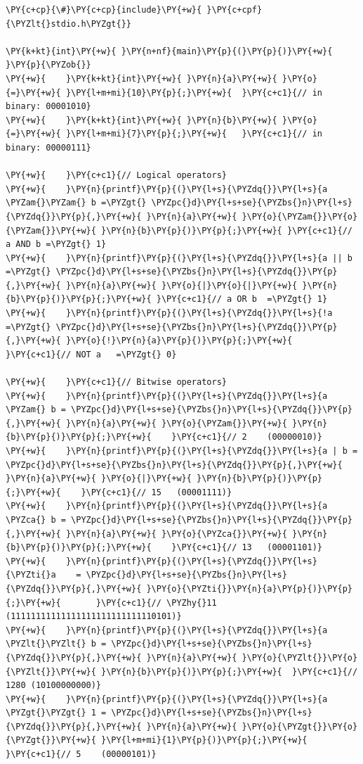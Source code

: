 \begin{Verbatim}[label=\makebox{\url{https://github.com/lucabaldini/cmepda/tree/master/slides/latex/snippets/bitwise_and_logical.c}},commandchars=\\\{\}]
\PY{c+cp}{\#}\PY{c+cp}{include}\PY{+w}{ }\PY{c+cpf}{\PYZlt{}stdio.h\PYZgt{}}

\PY{k+kt}{int}\PY{+w}{ }\PY{n+nf}{main}\PY{p}{(}\PY{p}{)}\PY{+w}{ }\PY{p}{\PYZob{}}
\PY{+w}{    }\PY{k+kt}{int}\PY{+w}{ }\PY{n}{a}\PY{+w}{ }\PY{o}{=}\PY{+w}{ }\PY{l+m+mi}{10}\PY{p}{;}\PY{+w}{  }\PY{c+c1}{// in binary: 00001010}
\PY{+w}{    }\PY{k+kt}{int}\PY{+w}{ }\PY{n}{b}\PY{+w}{ }\PY{o}{=}\PY{+w}{ }\PY{l+m+mi}{7}\PY{p}{;}\PY{+w}{   }\PY{c+c1}{// in binary: 00000111}

\PY{+w}{    }\PY{c+c1}{// Logical operators}
\PY{+w}{    }\PY{n}{printf}\PY{p}{(}\PY{l+s}{\PYZdq{}}\PY{l+s}{a \PYZam{}\PYZam{} b =\PYZgt{} \PYZpc{}d}\PY{l+s+se}{\PYZbs{}n}\PY{l+s}{\PYZdq{}}\PY{p}{,}\PY{+w}{ }\PY{n}{a}\PY{+w}{ }\PY{o}{\PYZam{}}\PY{o}{\PYZam{}}\PY{+w}{ }\PY{n}{b}\PY{p}{)}\PY{p}{;}\PY{+w}{ }\PY{c+c1}{// a AND b =\PYZgt{} 1}
\PY{+w}{    }\PY{n}{printf}\PY{p}{(}\PY{l+s}{\PYZdq{}}\PY{l+s}{a || b =\PYZgt{} \PYZpc{}d}\PY{l+s+se}{\PYZbs{}n}\PY{l+s}{\PYZdq{}}\PY{p}{,}\PY{+w}{ }\PY{n}{a}\PY{+w}{ }\PY{o}{|}\PY{o}{|}\PY{+w}{ }\PY{n}{b}\PY{p}{)}\PY{p}{;}\PY{+w}{ }\PY{c+c1}{// a OR b  =\PYZgt{} 1}
\PY{+w}{    }\PY{n}{printf}\PY{p}{(}\PY{l+s}{\PYZdq{}}\PY{l+s}{!a     =\PYZgt{} \PYZpc{}d}\PY{l+s+se}{\PYZbs{}n}\PY{l+s}{\PYZdq{}}\PY{p}{,}\PY{+w}{ }\PY{o}{!}\PY{n}{a}\PY{p}{)}\PY{p}{;}\PY{+w}{     }\PY{c+c1}{// NOT a   =\PYZgt{} 0}

\PY{+w}{    }\PY{c+c1}{// Bitwise operators}
\PY{+w}{    }\PY{n}{printf}\PY{p}{(}\PY{l+s}{\PYZdq{}}\PY{l+s}{a \PYZam{} b = \PYZpc{}d}\PY{l+s+se}{\PYZbs{}n}\PY{l+s}{\PYZdq{}}\PY{p}{,}\PY{+w}{ }\PY{n}{a}\PY{+w}{ }\PY{o}{\PYZam{}}\PY{+w}{ }\PY{n}{b}\PY{p}{)}\PY{p}{;}\PY{+w}{    }\PY{c+c1}{// 2    (00000010)}
\PY{+w}{    }\PY{n}{printf}\PY{p}{(}\PY{l+s}{\PYZdq{}}\PY{l+s}{a | b = \PYZpc{}d}\PY{l+s+se}{\PYZbs{}n}\PY{l+s}{\PYZdq{}}\PY{p}{,}\PY{+w}{ }\PY{n}{a}\PY{+w}{ }\PY{o}{|}\PY{+w}{ }\PY{n}{b}\PY{p}{)}\PY{p}{;}\PY{+w}{    }\PY{c+c1}{// 15   (00001111)}
\PY{+w}{    }\PY{n}{printf}\PY{p}{(}\PY{l+s}{\PYZdq{}}\PY{l+s}{a \PYZca{} b = \PYZpc{}d}\PY{l+s+se}{\PYZbs{}n}\PY{l+s}{\PYZdq{}}\PY{p}{,}\PY{+w}{ }\PY{n}{a}\PY{+w}{ }\PY{o}{\PYZca{}}\PY{+w}{ }\PY{n}{b}\PY{p}{)}\PY{p}{;}\PY{+w}{    }\PY{c+c1}{// 13   (00001101)}
\PY{+w}{    }\PY{n}{printf}\PY{p}{(}\PY{l+s}{\PYZdq{}}\PY{l+s}{\PYZti{}a    = \PYZpc{}d}\PY{l+s+se}{\PYZbs{}n}\PY{l+s}{\PYZdq{}}\PY{p}{,}\PY{+w}{ }\PY{o}{\PYZti{}}\PY{n}{a}\PY{p}{)}\PY{p}{;}\PY{+w}{       }\PY{c+c1}{// \PYZhy{}11  (11111111111111111111111111110101)}
\PY{+w}{    }\PY{n}{printf}\PY{p}{(}\PY{l+s}{\PYZdq{}}\PY{l+s}{a \PYZlt{}\PYZlt{} b = \PYZpc{}d}\PY{l+s+se}{\PYZbs{}n}\PY{l+s}{\PYZdq{}}\PY{p}{,}\PY{+w}{ }\PY{n}{a}\PY{+w}{ }\PY{o}{\PYZlt{}}\PY{o}{\PYZlt{}}\PY{+w}{ }\PY{n}{b}\PY{p}{)}\PY{p}{;}\PY{+w}{  }\PY{c+c1}{// 1280 (10100000000)}
\PY{+w}{    }\PY{n}{printf}\PY{p}{(}\PY{l+s}{\PYZdq{}}\PY{l+s}{a \PYZgt{}\PYZgt{} 1 = \PYZpc{}d}\PY{l+s+se}{\PYZbs{}n}\PY{l+s}{\PYZdq{}}\PY{p}{,}\PY{+w}{ }\PY{n}{a}\PY{+w}{ }\PY{o}{\PYZgt{}}\PY{o}{\PYZgt{}}\PY{+w}{ }\PY{l+m+mi}{1}\PY{p}{)}\PY{p}{;}\PY{+w}{  }\PY{c+c1}{// 5    (00000101)}


\end{Verbatim}
